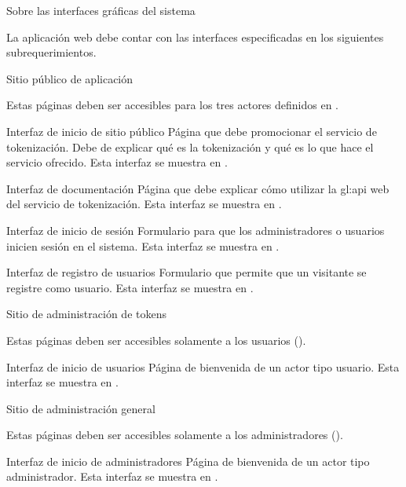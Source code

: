 {Sobre las interfaces gráficas del sistema}
{
  La aplicación web debe contar con las interfaces especificadas en los
  siguientes subrequerimientos.

  {Sitio público de aplicación}
  {
    Estas páginas deben ser accesibles para los tres actores definidos en
    .

    {Interfaz de inicio de sitio público}
    {
      Página que debe promocionar el servicio de tokenización. Debe de explicar
      qué es la tokenización y qué es lo que hace el servicio ofrecido. Esta
      interfaz se muestra en .
    }

    {Interfaz de documentación}
    {
      Página que debe explicar cómo utilizar la \gls{gl:api} web del
      servicio de tokenización. Esta interfaz se muestra en
      .
    }

    {Interfaz de inicio de sesión}
    {
      Formulario para que los administradores o usuarios inicien sesión en el
      sistema. Esta interfaz se muestra en .
    }

    {Interfaz de registro de usuarios}
    {
       Formulario que permite que un visitante se registre como usuario.
       Esta interfaz se muestra en .
    }
  }

  {Sitio de administración de tokens}
  {
    Estas páginas deben ser accesibles solamente a los usuarios
    ().

    {Interfaz de inicio de usuarios}
    {
       Página de bienvenida de un actor tipo usuario. Esta interfaz se
       muestra en .
    }
  }

  {Sitio de administración general}
  {
    Estas páginas deben ser accesibles solamente a los administradores
    ().

    {Interfaz de inicio de administradores}
    {
      Página de bienvenida de un actor tipo administrador. Esta interfaz se
      muestra en .
    }
  }
}

